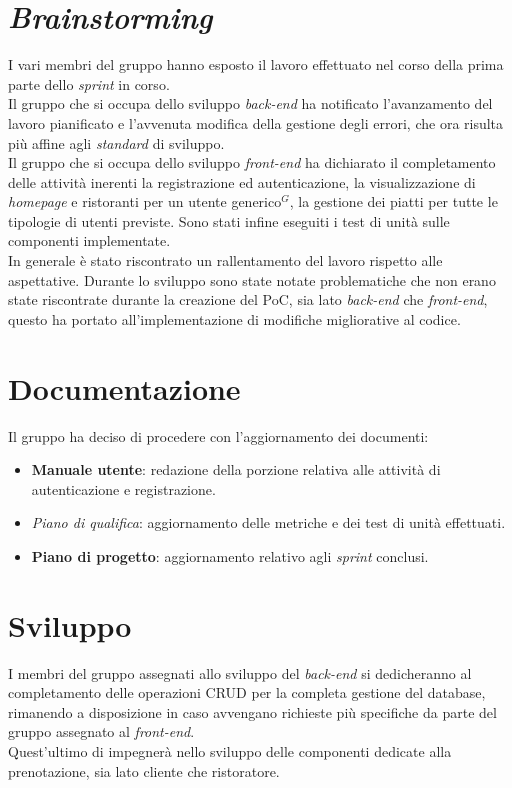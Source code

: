 \section{\textit{Brainstorming}}
I vari membri del gruppo hanno esposto il lavoro effettuato nel corso della prima parte dello \textit{sprint} in corso.\\
Il gruppo che si occupa dello sviluppo \textit{back-end} ha notificato l'avanzamento del lavoro pianificato e l'avvenuta modifica della gestione degli errori, che ora risulta più affine agli \textit{standard} di sviluppo.\\
Il gruppo che si occupa dello sviluppo \textit{front-end} ha dichiarato il completamento delle attività inerenti la registrazione ed autenticazione, la visualizzazione di \textit{homepage} e ristoranti per un utente generico$^G$, la gestione dei piatti per tutte le tipologie di utenti previste.
Sono stati infine eseguiti i test di unità sulle componenti implementate.\\
In generale è stato riscontrato un rallentamento del lavoro rispetto alle aspettative.
Durante lo sviluppo sono state notate problematiche che non erano state riscontrate durante la creazione del PoC, sia lato \textit{back-end} che \textit{front-end}, questo ha portato all'implementazione di modifiche migliorative al codice.


\section{Documentazione}
Il gruppo ha deciso di procedere con l'aggiornamento dei documenti:
\begin{itemize}
    \item \textbf{Manuale utente}: redazione della porzione relativa alle attività di autenticazione e registrazione.
    \item \textit{Piano di qualifica}: aggiornamento delle metriche e dei test di unità effettuati.
    \item \textbf{Piano di progetto}: aggiornamento relativo agli \textit{sprint} conclusi.
\end{itemize}


\section{Sviluppo}
I membri del gruppo assegnati allo sviluppo del \textit{back-end} si dedicheranno al completamento delle operazioni CRUD per la completa gestione del database, rimanendo a disposizione in caso avvengano richieste più specifiche da parte del gruppo assegnato al \textit{front-end}.\\
Quest'ultimo di impegnerà nello sviluppo delle componenti dedicate alla prenotazione, sia lato cliente che ristoratore.

